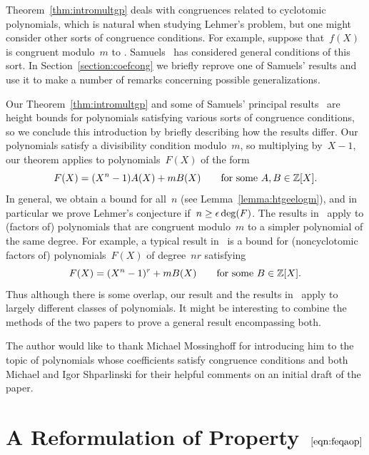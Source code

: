 \documentclass[12pt,reqno]{amsart}
\begin{document}
Theorem~\ref{thm:intromultgp} deals with congruences related to
cyclotomic polynomials, which is natural when studying Lehmer's
problem, but one might consider other sorts of congruence
conditions. For example, suppose that~$f(X)$ is congruent modulo~$m$
to .  Samuels~\cite{MR2313990} has
considered general conditions of this sort. In
Section~\ref{section:coefcong} we briefly reprove one of Samuels'
results and use it to make a number of remarks concerning possible
generalizations. 

\begin{remark}
Our Theorem~\ref{thm:intromultgp} and some of Samuels' principal
results~\cite{MR2313990} are height bounds for polynomials satisfying
various sorts of congruence conditions, so we conclude this
introduction by briefly describing how the results differ. Our
polynomials satisfy a divisibility condition modulo~$m$, so
multiplying by~$X-1$, our theorem applies to polynomials~$F(X)$ of the
form
\[
  F(X) = (X^n-1)A(X) + mB(X)\qquad\text{for some $A,B\in\mathbb{Z}[X]$.}
\]
In general, we obtain a bound for all~$n$ (see
Lemma~\ref{lemma:htgeelogm}), and in particular we prove Lehmer's
conjecture if~$n\ge\epsilon\deg(F)$. The results in~\cite{MR2313990} apply
to (factors of) polynomials that are congruent modulo~$m$ to a simpler
polynomial of the same degree. For example, a typical result
in~\cite{MR2313990} is a bound for (noncyclotomic factors of)
polynomials~$F(X)$ of degree~$nr$ satisfying
\[
  F(X) = (X^n-1)^r + mB(X)\qquad\text{for some $B\in\mathbb{Z}[X]$.}
\]
Thus although there is some overlap, our result and the results
in~\cite{MR2313990} apply to largely different classes of polynomials.
It might be interesting to combine the methods of the two papers to
prove a general result encompassing both.
\end{remark}


\begin{acknowledgement}
The author would like to thank Michael Mossinghoff for introducing him
to the topic of polynomials whose coefficients satisfy congruence
conditions and both Michael and Igor Shparlinski for their helpful
comments on an initial draft of the paper.
\end{acknowledgement}


\section{A Reformulation of Property~$\eqref{eqn:feqaop}$}
\label{section:prop1}
\end{document}
